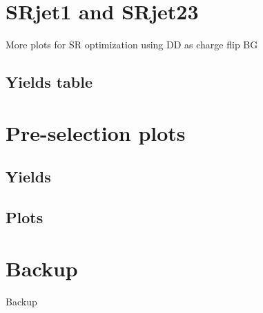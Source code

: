 \documentclass[mathserif,serif]{beamer}
\begin{document}

\section{SRjet1 and SRjet23}
\begin{frame}
\begin{center}
\huge
More plots for SR optimization using DD as charge flip BG
\end{center}
\end{frame}




\subsection{Yields table}



\section{Pre-selection plots}
\subsection{Yields}

\subsection{Plots}


\section*{Backup}
\begin{frame}
\begin{center}
\huge
Backup
\end{center}
\end{frame}
\end{document}
